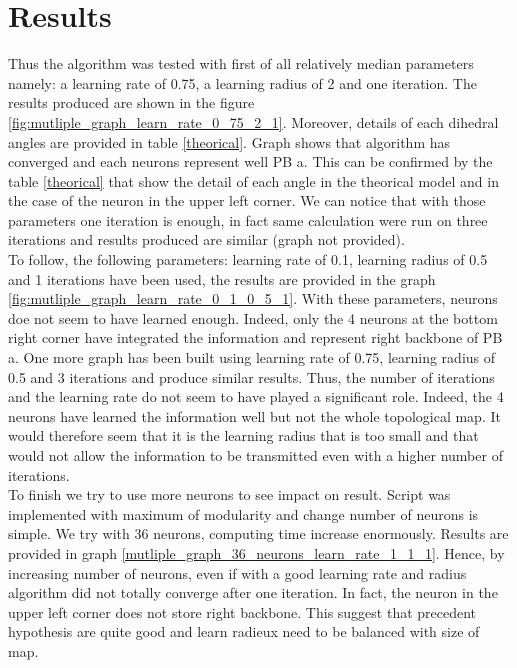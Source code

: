 \documentclass[11pt,a4paper]{article}
\begin{document}
    
    \section{Results}
    
    
    Thus the algorithm was tested with first of all relatively median parameters namely: a learning rate of 0.75, a learning radius of 2 and one iteration. The results produced are shown in the figure \ref{fig:mutliple_graph_learn_rate_0_75_2_1}. Moreover, details of each dihedral angles are provided in table \ref{theorical}. Graph shows that algorithm has converged and each neurons represent well PB a. This can be confirmed by the table \ref{theorical} that show the detail of each angle in the theorical model and in the case of the neuron in the upper left corner. We can notice that with those parameters one iteration is enough, in fact same calculation were run on three iterations and results produced are similar (graph not provided). \\
    To follow, the following parameters: learning rate of 0.1, learning radius of 0.5 and 1 iterations have been used, the results are provided in the graph \ref{fig:mutliple_graph_learn_rate_0_1_0_5_1}. With these parameters, neurons doe not seem to have learned enough. Indeed, only the 4 neurons at the bottom right corner have integrated the information and represent right backbone of PB a. One more graph has been built using learning rate of 0.75, learning radius of 0.5 and 3 iterations and produce similar results. Thus, the number of iterations and the learning rate do not seem to have played a significant role. Indeed, the 4 neurons have learned the information well but not the whole topological map. It would therefore seem that it is the learning radius that is too small and that would not allow the information to be transmitted even with a higher number of iterations.\\

    To finish we try to use more neurons to see impact on result. Script was implemented with maximum of modularity and change number of neurons is simple. We try with 36 neurons, computing time increase enormously. Results are provided in graph \ref{mutliple_graph_36_neurons_learn_rate_1_1_1}. Hence, by increasing number of neurons, even if with a good learning rate and radius algorithm did not totally converge after one iteration. In fact, the neuron in the upper left corner does not store right backbone. This suggest that precedent hypothesis are quite good and learn radieux need to be balanced with size of map.
    
\end{document}
